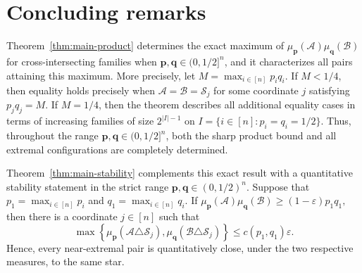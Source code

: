 \documentclass[11pt]{article}
\numberwithin{equation}{section}
\theoremstyle{definition}
\theoremstyle{remark}
\begin{document}
\section{Concluding remarks}\label{se4}



Theorem~\ref{thm:main-product} determines the exact maximum of
$
\mu_{\mathbf p}(\mathcal A)
\mu_{\mathbf q}(\mathcal B)
$
for cross-intersecting families when
$\mathbf p,\mathbf q\in(0,1/2]^n$, and it characterizes all pairs
attaining this maximum. More precisely, let
$
M=\max_{i\in[n]}p_iq_i.
$
If $M<1/4$, then equality holds precisely when
$
\mathcal A=\mathcal B=\mathcal S_j
$
for some coordinate $j$ satisfying $p_jq_j=M$. If $M=1/4$, then
the theorem describes all additional equality cases in terms of
increasing families of size $2^{|I|-1}$ on
$
I=\{i\in[n]:p_i=q_i=1/2\}.
$
Thus, throughout the range
$\mathbf p,\mathbf q\in(0,1/2]^n$, both the sharp product bound and
all extremal configurations are completely determined.


Theorem~\ref{thm:main-stability} complements this exact result with a
quantitative stability statement in the strict range
$\mathbf p,\mathbf q\in(0,1/2)^n$. Suppose that 
$
p_1=\max_{i\in[n]}p_i
$
and 
$
q_1=\max_{i\in[n]}q_i.
$
If
$
\mu_{\mathbf p}(\mathcal A)
\mu_{\mathbf q}(\mathcal B)
\geq
(1-\varepsilon)p_1q_1,
$
then there is a coordinate $j\in[n]$ such that
$$
\max\left\{
\mu_{\mathbf p}(\mathcal A\triangle\mathcal S_j),
\mu_{\mathbf q}(\mathcal B\triangle\mathcal S_j)
\right\}
\leq
c(p_1,q_1)\varepsilon.
$$
Hence, every near-extremal pair is quantitatively close, under the two
respective measures, to the same star.
\end{document}
